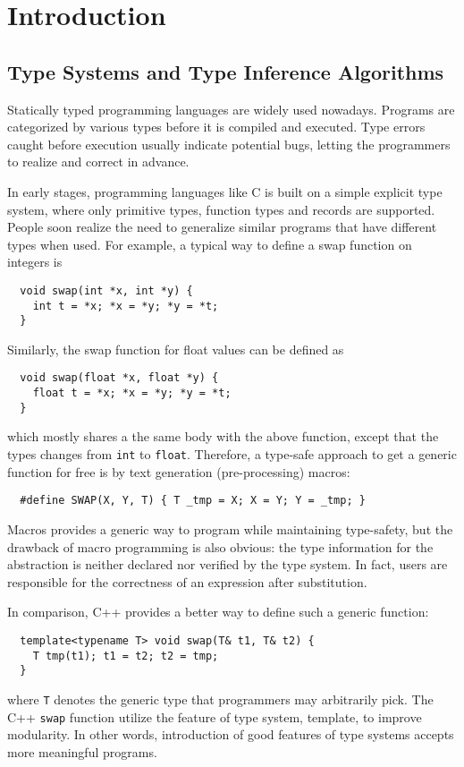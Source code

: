 \chapter{Introduction}


\section{Type Systems and Type Inference Algorithms}

Statically typed programming languages are widely used nowadays.
Programs are categorized by various types before it is compiled and executed.
Type errors caught before execution usually indicate potential bugs,
letting the programmers to realize and correct in advance.

In early stages, programming languages like C is built on a simple explicit type system,
where only primitive types, function types and records are supported.
People soon realize the need to generalize similar programs that have different types when used.
For example, a typical way to define a swap function on integers is
\begin{verbatim}
  void swap(int *x, int *y) {
    int t = *x; *x = *y; *y = *t;
  }
\end{verbatim}
Similarly, the swap function for float values can be defined as
\begin{verbatim}
  void swap(float *x, float *y) {
    float t = *x; *x = *y; *y = *t;
  }
\end{verbatim}
which mostly shares a the same body with the above function,
except that the types changes from \verb|int| to \verb|float|.
Therefore, a type-safe approach to get a generic function for free is by
text generation (pre-processing) macros:
\begin{verbatim}
  #define SWAP(X, Y, T) { T _tmp = X; X = Y; Y = _tmp; }
\end{verbatim}

Macros provides a generic way to program while maintaining type-safety,
but the drawback of macro programming is also obvious:
the type information for the abstraction is neither declared nor verified by
the type system.
In fact, users are responsible for the correctness of an expression after substitution.

In comparison, C++ provides a better way to define such a generic function:
\begin{verbatim}
  template<typename T> void swap(T& t1, T& t2) {
    T tmp(t1); t1 = t2; t2 = tmp;
  }
\end{verbatim}
where \verb|T| denotes the generic type that programmers may arbitrarily pick.
The C++ \verb|swap| function utilize the feature of type system, template,
to improve modularity.
In other words, introduction of good features of type systems
accepts more meaningful programs.

